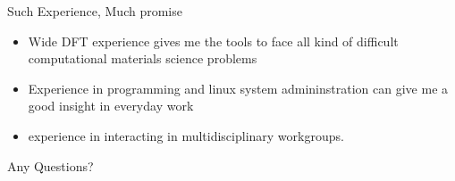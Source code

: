 \begin{frame}{\centering Such Experience, Much promise}
  \begin{itemize}
      \item Wide DFT experience gives me the tools to face all kind of difficult computational materials science 
	problems
      \item Experience in programming and linux system admininstration can give me a good insight in
	everyday work
      \item experience in interacting in multidisciplinary workgroups. 
  \end{itemize}


\end{frame}

\begin{frame}{Any Questions?}
\begin{center}
\resizebox{\textwidth}{0.8\textheight}{
\huge \textcolor{lightgray}{42}
}
\end{center}
\end{frame}
